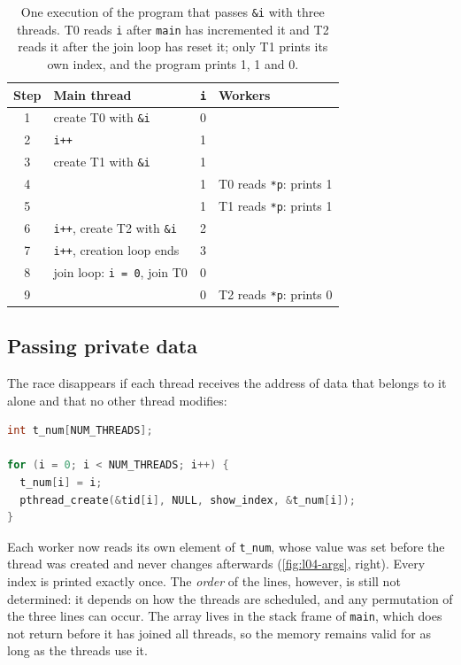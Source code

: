 \documentclass[../main.tex]{subfiles}
\begin{document}
\begin{table}[htbp]
  \centering
  \caption{One execution of the program that passes \texttt{\&i} with three
    threads.  T0 reads \texttt{i} after \texttt{main} has incremented it and
    T2 reads it after the join loop has reset it; only T1 prints its own
    index, and the program prints 1, 1 and 0.}
  \label{tab:l04-arg-race}
  \small
  \begin{tabular}{@{}clcl@{}}
    \toprule
    Step & Main thread & \texttt{i} & Workers \\
    \midrule
    1 & create T0 with \texttt{\&i}              & 0 & \\
    2 & \texttt{i++}                             & 1 & \\
    3 & create T1 with \texttt{\&i}              & 1 & \\
    4 &                                          & 1 & T0 reads \texttt{*p}: prints 1 \\
    5 &                                          & 1 & T1 reads \texttt{*p}: prints 1 \\
    6 & \texttt{i++}, create T2 with \texttt{\&i} & 2 & \\
    7 & \texttt{i++}, creation loop ends          & 3 & \\
    8 & join loop: \texttt{i = 0}, join T0        & 0 & \\
    9 &                                          & 0 & T2 reads \texttt{*p}: prints 0 \\
    \bottomrule
  \end{tabular}
\end{table}

\subsection{Passing private data}

The race disappears if each thread receives the address of data that
belongs to it alone and that no other thread modifies:
\begin{lstlisting}[language=C, numbers=none]
int t_num[NUM_THREADS];

for (i = 0; i < NUM_THREADS; i++) {
  t_num[i] = i;
  pthread_create(&tid[i], NULL, show_index, &t_num[i]);
}
\end{lstlisting}
Each worker now reads its own element of \texttt{t\_num}, whose value was
set before the thread was created and never changes afterwards
(\cref{fig:l04-args}, right).  Every index is printed exactly once.  The
\emph{order} of the lines, however, is still not determined: it depends on
how the threads are scheduled, and any permutation of the three lines can
occur.  The array lives in the stack frame
of \texttt{main}, which does not
return before it has joined all threads, so the memory remains valid for as
long as the threads use it.
\end{document}
